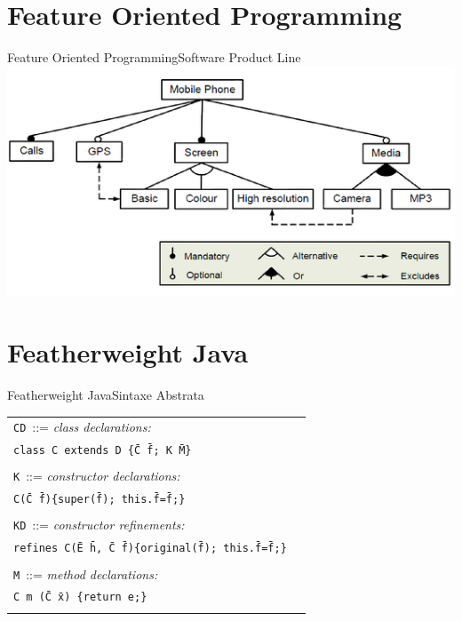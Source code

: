 \documentclass{beamer}
\newcommand{\cdecl}[6]{\texttt{class #1 extends #2 \{\={#3} \={#4}; #5 \={#6}\}}}
\newcommand{\mdecl}[5]{\texttt{#1 #2 (\={#3} \={#4}) \{return #5;\}}}
\begin{document}
    \section{Feature Oriented Programming}
    \begin{frame}{Feature Oriented Programming}{Software Product Line}
        \includegraphics[width=\textwidth]{spl-ex}
    \end{frame}

    \section{Featherweight Java}
    \begin{frame}{Featherweight Java}{Sintaxe Abstrata}
        \begin{table}[!ht]
            \centering
            \begin{tabular}{lr}
                \texttt{CD}~::= \hfill \textit{class declarations:}\\
                \quad \cdecl{C}{D}{C}{f}{K}{M} \\  \\
                \texttt{K}~::=  \hfill\textit{constructor declarations:}\\
                \quad \texttt{C(\={C}~\={f})\{super(\={f});~this.\={f}=\={f};\}}\\\\
                \texttt{KD}~::= \hfill\textit{constructor refinements:} \\
                \quad \texttt{refines~C(\={E}~\={h}, \={C} \={f})\{original(\={f}); this.\={f}=\={f};\}} \\\\
                \texttt{M}~::= \hfill\textit{method declarations:}\\
                \quad \mdecl{C}{m}{C}{x}{e} \\ \\
            \end{tabular}
            \quad
            \label{abstractsyntax}
        \end{table}
    \end{frame}
\end{document}
